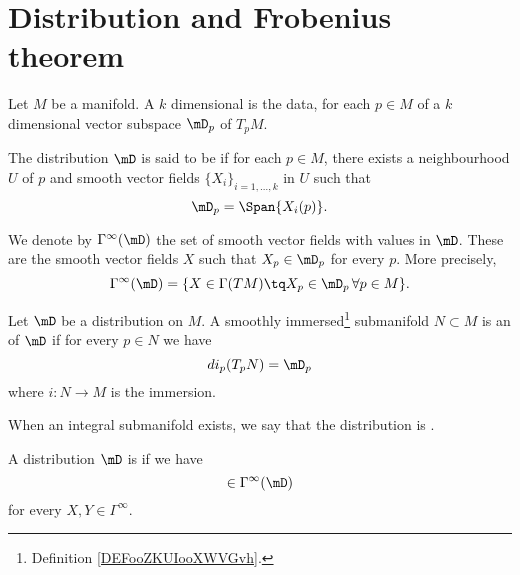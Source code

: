 \section{Distribution and Frobenius theorem}

\begin{definition}      \label{DEFooYOMHooZJvsSt}
    Let \( M\) be a manifold. A \( k\) dimensional  is the data, for each \( p\in M\) of a \( k\) dimensional vector subspace \( \mD_p\) of \( T_pM\).

    The distribution \( \mD\) is said to be  if for each \( p\in M\), there exists a neighbourhood \( U\) of \( p\) and smooth vector fields \( \{ X_i \}_{i=1,\ldots, k}\) in \( U\) such that
    \begin{equation}
        \mD_p=\Span\{ X_i(p) \}.
    \end{equation}

    We denote by \( \Gamma^{\infty}(\mD) \) the set of smooth vector fields with values in \( \mD\). These are the smooth vector fields \( X\) such that \( X_p\in \mD_p\) for every \( p\). More precisely,
    \begin{equation}
        \Gamma^{\infty}(\mD)=\{ X\in \Gamma(TM)\tq X_p\in\mD_p\,\forall p\in M \}.
    \end{equation}
\end{definition}

\begin{definition}
    Let \( \mD\) be a distribution on \( M\). A smoothly immersed\footnote{Definition \ref{DEFooZKUIooXWVGvh}.} submanifold \( N\subset M\) is an  of \( \mD\) if for every \( p\in N\) we have
    \begin{equation}
        di_p(T_pN)=\mD_p
    \end{equation}
    where \( i\colon N\to M\) is the immersion.

    When an integral submanifold exists, we say that the distribution is .
\end{definition}

\begin{definition}
    A distribution \( \mD\) is  if we have
    \begin{equation}
        [X,Y]\in \Gamma^{\infty}(\mD)
    \end{equation}
    for every \( X,Y\in \Gamma^{\infty}\).
\end{definition}

